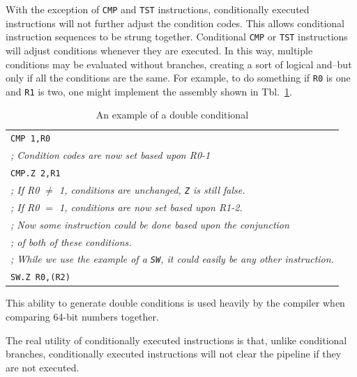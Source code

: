 \documentclass{gqtekspec}
\begin{document}
With the exception of \hbox{\tt CMP} and \hbox{\tt TST} instructions,
conditionally executed instructions will not further adjust the
condition codes.  This allows conditional instruction sequences to be
strung together.  Conditional \hbox{\tt CMP} or \hbox{\tt TST} instructions
will adjust conditions whenever they are executed.  In this way, multiple
conditions may be evaluated without branches, creating a sort of logical
and--but only if all the conditions are the same.  For example, to do
something if \hbox{\tt R0} is one and \hbox{\tt R1} is two, one might
implement the assembly shown in Tbl.~\ref{tbl:dbl-condition}.
\begin{table}\begin{center}
\begin{tabular}{l}
	{\tt CMP 1,R0} \\
	{\em ; Condition codes are now set based upon R0-1} \\
	{\tt CMP.Z 2,R1} \\
	{\em ; If R0 $\neq$ 1, conditions are unchanged, {\tt Z} is still false.} \\
	{\em ; If R0 $=$ 1, conditions are now set based upon R1-2.} \\
	{\em ; Now some instruction could be done based upon the conjunction} \\
	{\em ; of both of these conditions.} \\
	{\em ; While we use the example of a {\tt SW}, it could easily be any
		other instruction.} \\
	{\tt SW.Z R0,(R2)} \\
\end{tabular}
\caption{An example of a double conditional}\label{tbl:dbl-condition}
\end{center}\end{table}
This ability to generate double conditions is used heavily by the compiler
when comparing 64-bit numbers together.

The real utility of conditionally executed instructions is that, unlike
conditional branches, conditionally executed instructions will not clear the
pipeline if they are not executed.
\end{document}
